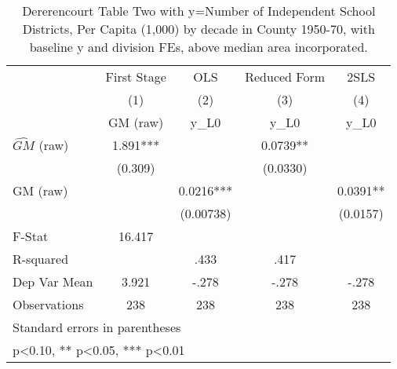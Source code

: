 \begin{table}[htbp]\centering
\def\sym#1{\ifmmode^{#1}\else\(^{#1}\)\fi}
\caption{Dererencourt Table Two with y=Number of Independent School Districts, Per Capita (1,000) by decade in County 1950-70, with baseline y and division FEs, above median area incorporated.}
\begin{tabular}{l*{4}{c}}
\toprule
                    & First Stage   &         OLS   &Reduced Form   &        2SLS   \\
                    &\multicolumn{1}{c}{(1)}&\multicolumn{1}{c}{(2)}&\multicolumn{1}{c}{(3)}&\multicolumn{1}{c}{(4)}\\
                    &\multicolumn{1}{c}{GM  (raw)}&\multicolumn{1}{c}{y\_L0}&\multicolumn{1}{c}{y\_L0}&\multicolumn{1}{c}{y\_L0}\\
\midrule
$\hat{GM}$ (raw)    &       1.891***&               &      0.0739** &               \\
                    &     (0.309)   &               &    (0.0330)   &               \\
\addlinespace
GM  (raw)           &               &      0.0216***&               &      0.0391** \\
                    &               &   (0.00738)   &               &    (0.0157)   \\
\midrule
F-Stat              &      16.417   &               &               &               \\
R-squared           &               &        .433   &        .417   &               \\
Dep Var Mean        &       3.921   &       -.278   &       -.278   &       -.278   \\
Observations        &         238   &         238   &         238   &         238   \\
\bottomrule
\multicolumn{5}{l}{\footnotesize Standard errors in parentheses}\\
\multicolumn{5}{l}{\footnotesize * p<0.10, ** p<0.05, *** p<0.01}\\
\end{tabular}
\end{table}
